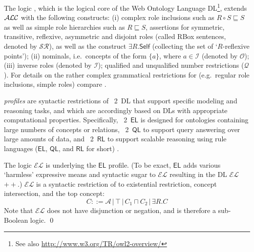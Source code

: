 \documentclass[10pt,fleqn,final]{scrreprt}
\newcommand{\cbs}[0]{\color{red}\xspace} %
\newcommand{\cbe}[0]{\color{black}\xspace} %
\newcommand{\QL}{\ensuremath{\mathsf{QL}}\xspace}
\newcommand{\RL}{\ensuremath{\mathsf{RL}}\xspace}
\newcommand{\EL}{\ensuremath{\mathsf{EL}}\xspace}
\newcommand{\ELDL}{\ensuremath{\mathcal{EL}}\xspace}
\newenvironment{definitions}[0]{\medskip }{}
\begin{document}
\begin{definitions}
\begin{definition}
The logic \SROIQ \cite{SROIQ}, which is the logical core of the Web Ontology
Language  DL\footnote{See also \url{http://www.w3.org/TR/owl2-overview/}}, extends $\mathcal{ALC}$
with the following constructs: (i) complex role inclusions such as $R \circ S \sqsubseteq S$
as well as simple role hierarchies such as $R \sqsubseteq S$,
assertions for symmetric, transitive, reflexive, asymmetric and
disjoint roles (called RBox sentences, denoted by $\mathcal{SR}$), as well as the construct
$\exists R . \mathsf{Self}$ (collecting the set of `$R$-reflexive
points'); (ii) nominals, i.e.\ concepts of the form $\{a\}$, where $a\in\mathcal{I}$ (denoted by $\mathcal{O}$); (iii) inverse
roles (denoted by $\mathcal{I}$); qualified and unqualified number
restrictions ($\mathcal{Q}$). For details on the rather complex
grammatical restrictions for \SROIQ (e.g.\ regular role inclusions,
simple roles) compare \cite{SROIQ}.

\OWL \emph{profiles} are syntactic restrictions of \OWL~2~DL that support specific modeling and reasoning tasks, %
and which are accordingly based on DLs with appropriate computational properties. Specifically, \OWL~2~\EL is designed for ontologies containing large numbers of concepts or relations, \OWL~2~\QL to support query answering over large amounts of data, and \OWL~2~\RL to support scalable reasoning using rule languages (\EL, \QL, and \RL for short) .
 
\cbs The logic \ELDL is underlying the \EL profile. (To be exact, \EL adds various `harmless' expressive means and syntactic sugar to \ELDL resulting in the DL \ELDL$++$.) %
\ELDL is a syntactic restriction of \ALC to existential restriction, concept
intersection, and the top concept:
$$C ::= {\mathcal A} \,|\, \top \,|\,  C_1 \sqcap C_2 \,|\, \exists R . C$$
Note that \ELDL does not have disjunction or negation, and is therefore a sub-Boolean logic.\cbe
\qed\end{definition}



\end{definitions}
\end{document}
